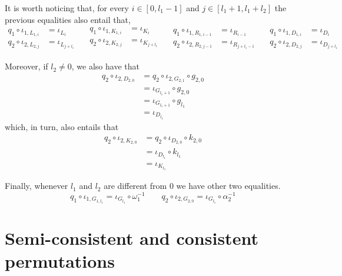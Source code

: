 \begin{remark}\label{rem:dett2}
	It is worth noticing that, for every $i\in [0,l_1-1]$ and $j\in [l_1+1, l_1+l_2]$ the previous equalities also entail that,
	\[\begin{split}q_1\circ \iota_{1, L_{1,i}}&=\iota_{L_{i}}\\q_2\circ \iota_{2, L_{2,j}}&=\iota_{L_{j+l_1}} 	
	\end{split} \quad 
	\begin{split}    	q_1\circ \iota_{1, K_{1,i}}&=\iota_{K_{i}} \\q_2\circ \iota_{2, K_{2,j}}&=\iota_{K_{j+l_1}}\\ \end{split}\quad 
	\begin{split}    	q_1\circ \iota_{1, R_{1,i-1}}&=\iota_{R_{i-1}} \\q_2\circ \iota_{2, R_{2,j-1}}&=\iota_{R_{j+l_1-1}}\end{split}\quad 
	\begin{split}    	q_1\circ \iota_{1, D_{1,i}}&=\iota_{D_{i}} \\q_2\circ \iota_{2, D_{2,j}}&=\iota_{D_{j+l_1}}\end{split}\]
	
	Moreover, if $l_2\neq 0$, we also have that
	\begin{align*} 
		q_2\circ \iota_{2, D_{2, 0}}&=q_2\circ \iota_{2, G_{2, 1}}\circ g_{2, 0}\\&=\iota_{G_{l_1+1}}\circ g_{2,0}\\&=\iota_{G_{l_1+1}}\circ g_{l_1}\\&=\iota_{D_{l_1}}
	\end{align*}
	which, in turn, also entails that
	\begin{align*}
		q_2\circ \iota_{2, K_{2, 0}}&=q_2\circ \iota_{D_{2, 0}}\circ k_{2, 0}\\&=\iota_{D_{l_1}}\circ k_{l_1}\\&=\iota_{K_{l_1}}
	\end{align*}
	
	Finally, whenever $l_1$ and $l_2$ are different from $0$ we have other two equalities.
	\[q_1\circ \iota_{1, G_{1, l_1}}=\iota_{ G_{l_1}}\circ \omega^{-1}_1 \qquad q_2\circ \iota_{2, G_{2, 0}}=\iota_{ G_{l_1}}\circ \alpha^{-1}_2\]
	
\end{remark}




\section{Semi-consistent and consistent permutations}
	
